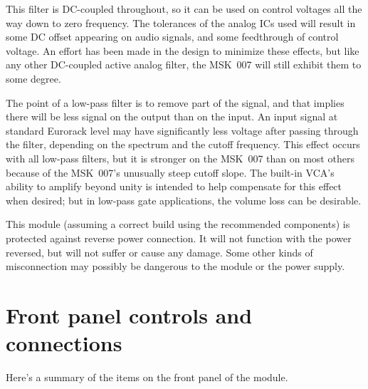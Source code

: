 This filter is DC-coupled throughout, so it can be used on control voltages
all the way down to zero frequency.  The tolerances of the analog ICs used
will result in some DC offset appearing on audio signals, and some
feedthrough of control voltage.  An effort has been made in the design to
minimize these effects, but like any other DC-coupled active analog filter,
the MSK~007 will still exhibit them to some degree.

The point of a low-pass filter is to remove part of the signal, and
that implies there will be less signal on the output than on the input.  An
input signal at standard Eurorack level may have significantly less voltage
after passing through the filter, depending on the spectrum and the cutoff
frequency.  This effect occurs with all low-pass filters, but it is stronger
on the MSK~007 than on most others because of the MSK~007's unusually steep
cutoff slope.  The built-in VCA's ability to amplify beyond unity is
intended to help compensate for this effect when desired; but in low-pass
gate applications, the volume loss can be desirable.

This module (assuming a correct build using the recommended components) is
protected against reverse power connection.  It will not function with the
power reversed, but will not suffer or cause any damage.  Some other kinds
of misconnection may possibly be dangerous to the module or the power
supply.

\section{Front panel controls and connections}

Here's a summary of the items on the front panel of the module.

